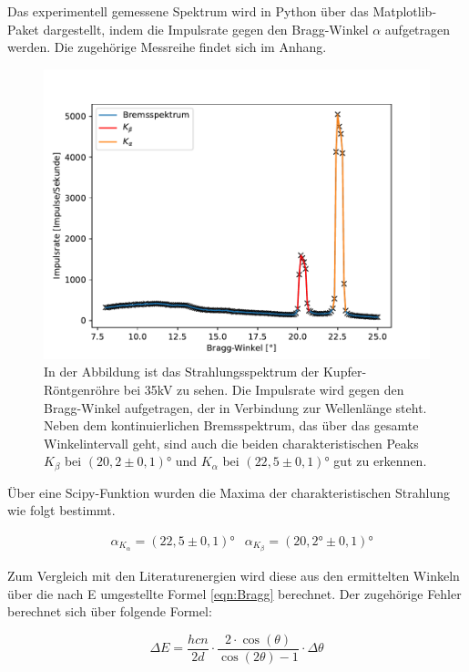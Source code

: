 \documentclass[titlepage = firstcover]{scrartcl}
\begin{document}
        \noindent
        Das experimentell gemessene Spektrum wird in Python über das Matplotlib-Paket dargestellt, indem die Impulsrate gegen den Bragg-Winkel $\alpha$ aufgetragen werden. Die zugehörige 
        Messreihe findet sich im Anhang.
        
        \FloatBarrier
        \begin{figure}[h]
            \centering
            \includegraphics[width = 0.9\linewidth]{Spektrum_Cu.pdf}
            \caption{In der Abbildung ist das Strahlungsspektrum der Kupfer-Röntgenröhre bei 35kV zu sehen. Die Impulsrate wird gegen den Bragg-Winkel aufgetragen, der in Verbindung zur Wellenlänge steht. Neben dem kontinuierlichen Bremsspektrum, das über das gesamte Winkelintervall geht, sind auch die beiden charakteristischen Peaks $K_{\beta}$ bei $(20,2 \pm 0,1)°$ und $K_{\alpha}$ bei $(22,5 \pm 0,1)°$ gut zu erkennen.}
            \label{fig:Spektrum}
        \end{figure}
        \FloatBarrier
        \noindent
        Über eine Scipy-Funktion wurden die Maxima der charakteristischen Strahlung wie folgt bestimmt.

        \begin{align}
            &\alpha_{K_{\alpha}} = (22,5 \pm 0,1)°
            &\alpha_{K_{\beta}}  = (20,2° \pm 0,1)°
        \end{align}

        \noindent
        Zum Vergleich mit den Literaturenergien wird diese aus den ermittelten Winkeln über die nach E umgestellte Formel \ref{eqn:Bragg} berechnet. Der zugehörige Fehler berechnet sich über
        folgende Formel:

        \begin{equation*}
            \Delta E = \frac{hcn}{2d} \cdot \frac{2 \cdot \cos(\theta)}{\cos(2\theta)-1} \cdot \Delta \theta
        \end{equation*}
\end{document}

